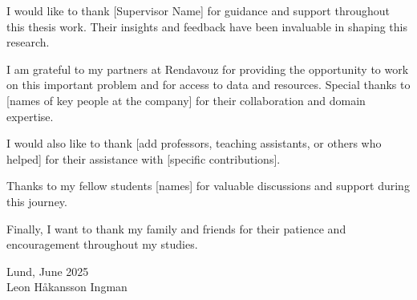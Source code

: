 
I would like to thank [Supervisor Name] for guidance and support throughout this thesis work. Their insights and feedback have been invaluable in shaping this research.

I am grateful to my partners at Rendavouz for providing the opportunity to work on this important problem and for access to data and resources. Special thanks to [names of key people at the company] for their collaboration and domain expertise.

I would also like to thank [add professors, teaching assistants, or others who helped] for their assistance with [specific contributions].

Thanks to my fellow students [names] for valuable discussions and support during this journey.

Finally, I want to thank my family and friends for their patience and encouragement throughout my studies.

\vspace{1cm}
\noindent
Lund, June 2025\\
Leon Håkansson Ingman
